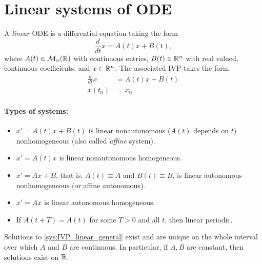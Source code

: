 \section{Linear systems of ODE}
\begin{definition}
A \emph{linear} ODE is a differential equation taking the form
\begin{equation}\label{sys:linear_general}
\frac{d}{dt}x=A(t)x+B(t),
\end{equation}
where $A(t)\in\mathcal{M}_n(\mathbb{R})$ with continuous entries, $B(t)\in\mathbb{R}^n$ with real valued, continuous coefficients, and $x\in\mathbb{R}^n$. The associated IVP takes the form 
\begin{equation}\label{sys:IVP_linear_general}
\begin{aligned}
\frac{d}{dt}x &= A(t)x+B(t) \\
x(t_0)&=x_0.
\end{aligned}
\end{equation}
\end{definition}

\paragraph{Types of systems:}
\begin{itemize}
\item $x'=A(t)x+B(t)$ is linear nonautonomous ($A(t)$ depends on $t$) nonhomogeneous (also called \emph{affine} system).
\item $x'=A(t)x$ is linear nonautonomous homogeneous.
\item $x'=Ax+B$, that is, $A(t)\equiv A$ and $B(t)\equiv B$, is linear autonomous nonhomogeneous (or affine autonomous).
\item $x'=Ax$ is linear autonomous homogeneous.
\end{itemize}
\begin{itemize}
\item If $A(t+T)=A(t)$ for some $T>0$ and all $t$, then linear periodic.
\end{itemize}



\begin{theorem}
Solutions to \eqref{sys:IVP_linear_general} exist and are unique on the whole interval over which $A$ and $B$ are continuous.
In particular, if $A,B$ are constant, then solutions exist on $\mathbb{R}$.
\end{theorem}



